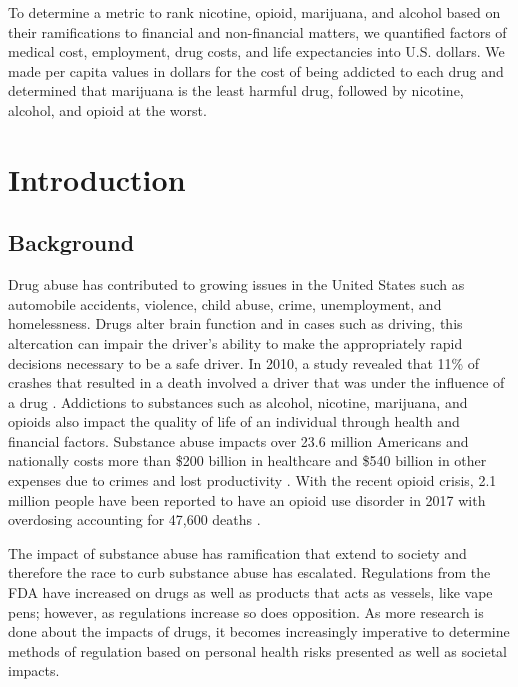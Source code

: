 \documentclass[12pt]{article}
\begin{document}
To determine a metric to rank nicotine, opioid, marijuana, and alcohol based on their ramifications to financial and non-financial matters, we quantified factors of medical cost, employment, drug costs, and life expectancies into U.S. dollars. We made per capita values in dollars for the cost of being addicted to each drug  and  determined that marijuana is the least harmful drug, followed by nicotine, alcohol, and opioid at the worst.


\newpage
\tableofcontents

\section{Introduction}

\subsection{Background}
Drug abuse has contributed to growing issues in the United States such as automobile accidents, violence, child abuse, crime, unemployment, and homelessness. Drugs alter brain function and in cases such as driving, this altercation can impair the driver’s ability to make the appropriately rapid decisions necessary to be a safe driver. In 2010, a study revealed that 11\% of crashes that resulted in a death involved a driver that was under the influence of a drug \cite{three}. Addictions to substances such as alcohol, nicotine, marijuana, and opioids also impact the quality of life of an individual through health and financial factors. Substance abuse impacts over 23.6 million Americans \cite{one} and nationally costs more than \$200 billion in healthcare \cite{two} and \$540 billion in other expenses due to crimes and lost productivity \cite{two}. With the recent opioid crisis, 2.1 million people have been reported to have an opioid use disorder in 2017 with overdosing accounting for 47,600 deaths \cite{four}.

The impact of substance abuse has ramification that extend to society and therefore the race to curb substance abuse has escalated. Regulations from the FDA have increased on drugs as well as products that acts as vessels, like vape pens; however, as regulations increase so does opposition. As more research is done about the impacts of drugs, it becomes increasingly imperative to determine methods of regulation based on personal health risks presented as well as societal impacts. 
\end{document}
